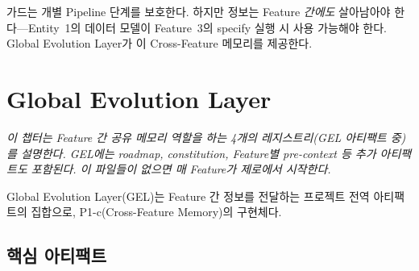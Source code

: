 \documentclass[11pt,a4paper,openright,twoside]{report}
\begin{document}
가드는 개별 Pipeline 단계를 보호한다. 하지만 정보는 Feature \emph{간에도} 살아남아야 한다---Entity~1의 데이터 모델이 Feature~3의 specify 실행 시 사용 가능해야 한다. Global Evolution Layer가 이 Cross-Feature 메모리를 제공한다.

\chapter{Global Evolution Layer}
\label{ch:gel}

\textit{이 챕터는 Feature 간 공유 메모리 역할을 하는 4개의 레지스트리(GEL 아티팩트 중)를 설명한다. GEL에는 roadmap, constitution, Feature별 pre-context 등 추가 아티팩트도 포함된다. 이 파일들이 없으면 매 Feature가 제로에서 시작한다.}

Global Evolution Layer(GEL)는 Feature 간 정보를 전달하는 프로젝트 전역 아티팩트의 집합으로, P1-c(Cross-Feature Memory)의 구현체다.

\section{핵심 아티팩트}
\end{document}
